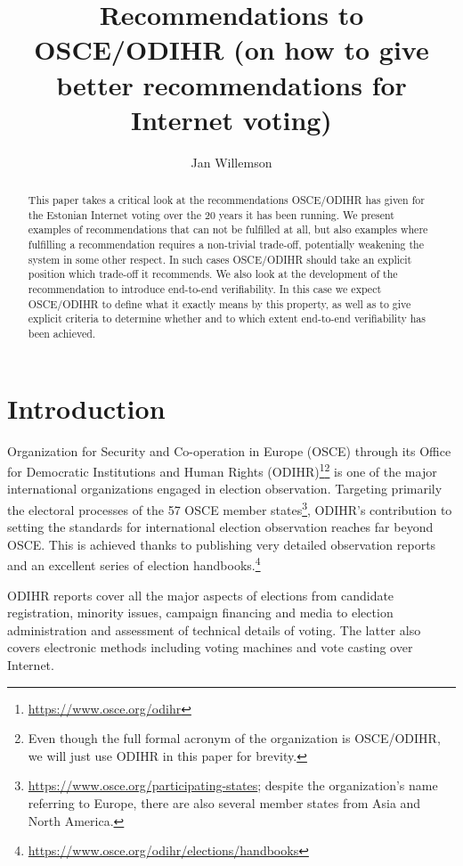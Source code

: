 \documentclass{llncs}
\title{Recommendations to OSCE/ODIHR (on how to give better recommendations for Internet voting)}
\author{Jan Willemson}
\institute{Cybernetica, Narva mnt 20, Tartu 51009, Estonia}
\date{}
\newcommand{\footurl}[1]{\footnote{\url{#1}}}
\begin{document}
\maketitle

\begin{abstract}
    This paper takes a critical look at the recommendations OSCE/ODIHR has given for the Estonian Internet voting over the 20 years it has been running. We present examples of recommendations that can not be fulfilled at all, but also examples where fulfilling a recommendation requires a non-trivial trade-off, potentially weakening the system in some other respect. In such cases OSCE/ODIHR should take an explicit position which trade-off it recommends. We also look at the development of the recommendation to introduce end-to-end verifiability. In this case we expect OSCE/ODIHR to define what it exactly means by this property, as well as to give explicit criteria to determine whether and to which extent end-to-end verifiability has been achieved.
\end{abstract}

\section{Introduction}
\label{sec:introduction}

Organization for Security and Co-operation in Europe (OSCE) through its Office for Democratic Institutions and Human Rights (ODIHR)\footurl{https://www.osce.org/odihr}\footnote{Even though the full formal acronym of the organization is OSCE/ODIHR, we will just use ODIHR in this paper for brevity.} is one of the major international organizations engaged in election observation. Targeting primarily the electoral processes of the 57 OSCE member states\footnote{\url{https://www.osce.org/participating-states}; despite the organization's name referring to Europe, there are also several member states from Asia and North America.}, ODIHR's contribution to setting the standards for international election observation reaches far beyond OSCE. This is achieved thanks to publishing very detailed observation reports and an excellent series of election handbooks.\footurl{https://www.osce.org/odihr/elections/handbooks}

ODIHR reports cover all the major aspects of elections from candidate registration, minority issues, campaign financing and media to election administration and assessment of technical details of voting. The latter also covers electronic methods including voting machines and vote casting over Internet. 
\end{document}
